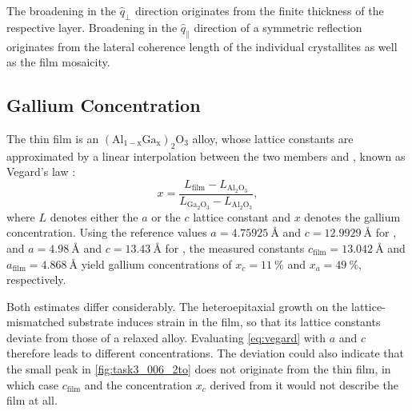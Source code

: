 The broadening in the $\hat{q}_{\perp}$ direction originates from the finite
thickness of the respective layer. Broadening in the $\hat{q}_{\parallel}$ direction
of a symmetric reflection originates from the lateral coherence length of the individual
crystallites as well as the film mosaicity.

\subsection{Gallium Concentration}

The thin film is an $\mathrm{(Al_{1-x}Ga_{x})_{2}O_{3}}$ alloy, whose lattice constants
are approximated by a linear interpolation between the two members 
and , known as Vegard's law \autocite{vegard_konstitution_1921}:
\begin{equation}
	x=\frac{L_{\mathrm{film}}-L_{\mathrm{Al_{2}O_{3}}}}{L_{\mathrm{Ga_{2}O_{3}}}-L_{\mathrm{Al_{2}O_{3}}}}
	, \label{eq:vegard}
\end{equation}
where $L$ denotes either the $a$ or the $c$ lattice constant and $x$ denotes the
gallium concentration. Using the reference values $a=\qty{4.75925}{\angstrom}$ and
$c=\qty{12.9929}{\angstrom}$ for  \autocite{wsi2007hrxrd}, and
$a=\qty{4.98}{\angstrom}$ and $c=\qty{13.43}{\angstrom}$ for  \autocite{pearton_review_2018},
the measured constants $c_{\mathrm{film}}=\qty{13.042}{\angstrom}$ and $a_{\mathrm{film}}
=\qty{4.868}{\angstrom}$ yield gallium concentrations of $x_{c}=\qty{11}{\percent}$
and $x_{a}=\qty{49}{\percent}$, respectively.

Both estimates differ considerably. The heteroepitaxial growth on the lattice-mismatched
substrate induces strain in the film, so that its lattice constants deviate from
those of a relaxed alloy. Evaluating \cref{eq:vegard} with $a$ and $c$ therefore leads
to different concentrations. The deviation could also indicate that the small
peak in \cref{fig:task3_006_2to} does not originate from the thin film, in which case
$c_{\mathrm{film}}$ and the concentration $x_{c}$ derived from it would not describe
the film at all.